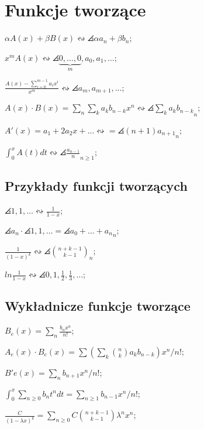 \section{Funkcje tworzące}

\entry
$\alpha A(x) + \beta B(x) \leftrightsquigarrow \angles{\alpha a_n + \beta b_n}$;

\entry
$x^mA(x) \leftrightsquigarrow
  \angles{\underbrace{0, \dots, 0}_m, a_0, a_1, \dots}$;

\entry
$\frac{A(x) - \sum_{i=0}^{m-1}a_ix^i}{x^m} \leftrightsquigarrow
  \angles{a_m, a_{m+1}, \dots}$;

\entry
$A(x) \cdot B(x) =
  \sum_n \sum_k a_kb_{n-k}x^n \leftrightsquigarrow
  \angles{\sum_k a_k b_{n-k}}_n$;

\entry
$A'(x) = a_1 + 2a_2x + \dots \leftrightsquigarrow = \angles{(n+1)a_{n+1}}_n$;

\entry
$\int_0^xA(t)dt \leftrightsquigarrow \angles{\frac{a_{n-1}}{n}}_{n \geq 1}$;

\subsection{Przykłady funkcji tworzących}

\entry
$\angles{1,1,\dots} \leftrightsquigarrow \frac{1}{1-x}$;

\entry
$\angles{a_n} \cdot \angles{1,1,\dots} = \angles{a_0 + \dots + a_n}_n$;

\entry
$\frac{1}{(1-x)^k} \leftrightsquigarrow \angles{\binom{n + k -1}{k - 1}}_n$;

\entry
$ln \frac{1}{1-x} \leftrightsquigarrow
  \angles{0, 1, \frac{1}{2}, \frac{1}{3}, \dots}$;

\subsection{Wykładnicze funkcje tworzące}

\entry
$B_e(x) = \sum_n \frac{b_nx^n}{n!}$;

\entry
$A_e(x) \cdot B_e(x) =
  \sum \left ( \sum_k \binom{n}{k} a_k b_{n-k} \right ) x^n / n!$;

\entry
$B'e(x) = \sum_n b_{n+1} x^n/n!$;

\entry
$\int^x_0 \sum_{n \geq 0} b_nt^ndt = \sum_{n \geq 1} b_{n-1}x^n/n!$;

\entry
$\frac{C}{(1-\lambda x)^k} =
  \sum_{n\geq 0} C \binom{n + k - 1}{k - 1} \lambda^n x^n$;



